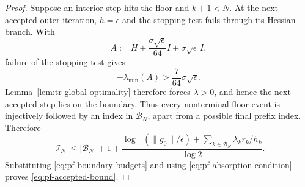 \begin{proof}
Suppose an interior step hits the floor and $k+1<N$.
At the next accepted outer iteration, $h=\epsilon$ and the stopping
test fails through its Hessian branch.
With
\[
    A
    :=
    H
    +
    \frac{\sigma\sqrt\epsilon}{64}I
    +
    \sigma\sqrt\epsilon\,I,
\]
failure of the stopping test gives
\[
    -\lambda_{\min}(A)
    >
    \frac{7}{64}\sigma\sqrt\epsilon.
\]
Lemma~\ref{lem:tr-global-optimality} therefore forces
$\lambda>0$, and hence the next accepted step lies on the boundary.
Thus every nonterminal floor event is injectively followed by an
index in $\mathcal B_N$, apart from a possible final prefix index.
Therefore
\begin{equation}
    |\mathcal I_N|
    \le
    |\mathcal B_N|+1
    +
    \frac{
        \log_+(\|g_0\|/\epsilon)
        +
        \sum_{k\in\mathcal B_N}
        \lambda_kr_k/h_k
    }{
        \log2
    }.
    \label{eq:pf-interior-potential}
\end{equation}
Substituting \eqref{eq:pf-boundary-budgets} and using
\eqref{eq:pf-absorption-condition} proves
\eqref{eq:pf-accepted-bound}.
\end{proof}



